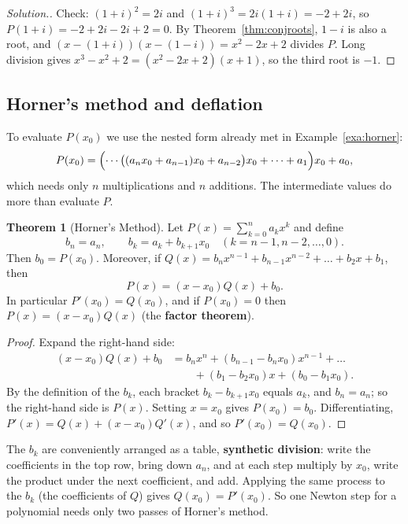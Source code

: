 \documentclass[11pt,a4paper]{article}
\numberwithin{equation}{section}
\theoremstyle{definition}
\newtheorem{thm}{Theorem}[subsection]
\newenvironment{solution}
  {\renewcommand{\qedsymbol}{}\begin{proof}[\textit{Solution}.]}
  {\end{proof}}
\begin{document}
\begin{solution}
Check: $(1+i)^2 = 2i$ and $(1+i)^3 = 2i(1+i) = -2+2i$, so $P(1+i) = -2+2i-2i+2 = 0$. By Theorem~\ref{thm:conjroots}, $1-i$ is also a root, and
$(x-(1+i))(x-(1-i)) = x^2-2x+2$ divides $P$. Long division gives $x^3-x^2+2 = (x^2-2x+2)(x+1)$, so the third root is $-1$.
\end{solution}


\subsection{Horner's method and deflation}
\label{sec:horner}

To evaluate $P(x_0)$ we use the nested form already met in Example~\ref{exa:horner}:
$$P(x_0) = \Bigl(\cdots\bigl((a_nx_0+a_{n-1})x_0+a_{n-2}\bigr)x_0+\dots+a_1\Bigr)x_0+a_0 ,$$
which needs only $n$ multiplications and $n$ additions. The intermediate values do more than evaluate $P$.

\begin{thm}[Horner's Method]
\label{thm:horner}
Let $P(x) = \sum_{k=0}^na_kx^k$ and define
$$b_n = a_n,\qquad b_k = a_k+b_{k+1}x_0\quad(k = n-1,n-2,\dots,0).$$
Then $b_0 = P(x_0)$. Moreover, if $Q(x) = b_nx^{n-1}+b_{n-1}x^{n-2}+\dots+b_2x+b_1$, then
$$P(x) = (x-x_0)Q(x)+b_0 .$$
In particular $P'(x_0) = Q(x_0)$, and if $P(x_0) = 0$ then $P(x) = (x-x_0)Q(x)$ (the \textbf{factor theorem}).
\end{thm}

\begin{proof}
Expand the right-hand side:
\begin{align*}
(x-x_0)Q(x)+b_0 &= b_nx^n+(b_{n-1}-b_nx_0)x^{n-1}+\dots\\
&\qquad+(b_1-b_2x_0)x+(b_0-b_1x_0) .
\end{align*}
By the definition of the $b_k$, each bracket $b_k-b_{k+1}x_0$ equals $a_k$, and $b_n = a_n$; so the right-hand side is $P(x)$. Setting
$x = x_0$ gives $P(x_0) = b_0$. Differentiating, $P'(x) = Q(x)+(x-x_0)Q'(x)$, and so $P'(x_0) = Q(x_0)$.
\end{proof}

The $b_k$ are conveniently arranged as a table, \textbf{synthetic division}: write the coefficients in the top row, bring down $a_n$, and at
each step multiply by $x_0$, write the product under the next coefficient, and add. Applying the same process to the $b_k$ (the
coefficients of $Q$) gives $Q(x_0) = P'(x_0)$. So one Newton step for a polynomial needs only two passes of Horner's method.
\end{document}
